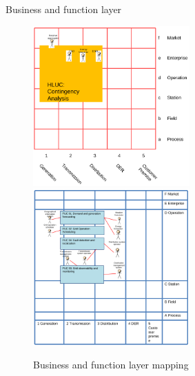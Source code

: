   \begin{frame}{Business and function layer}


\begin{figure}[!htb]\centering
  \includegraphics[width=6.0cm]{Data/business.png}
  \hspace{0.1cm}
  \includegraphics[width=6.0cm]{Data/function.png}
\caption{Business and function layer mapping}
\label{fig:functs}
\end{figure}





  \end{frame}


